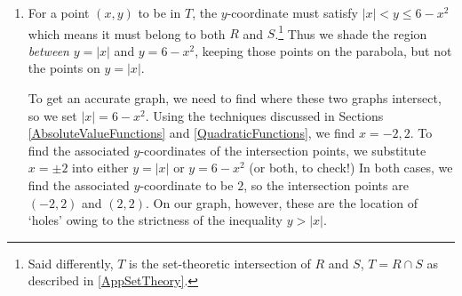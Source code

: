\documentclass{ximera}
\begin{document}
\begin{example}
\begin{explanation}
\begin{enumerate}
\begin{enumerate}
\begin{image}
\end{image}

\item For a point $(x,y)$ to be in $T$, the $y$-coordinate must satisfy $|x| < y \leq 6-x^2$ which means it must belong to both $R$ and $S$.\footnote{Said differently, $T$ is the set-theoretic intersection of $R$ and $S$, $T = R \cap S$ as described in \ref{AppSetTheory}.} Thus we shade the region \textit{between} $y=|x|$ and $y=6-x^2$, keeping those points on the parabola, but not the points on $y=|x|$.  

To get an accurate graph, we need to find where these two graphs intersect, so we set $|x| = 6-x^2$.  Using the techniques discussed in Sections \ref{AbsoluteValueFunctions} and \ref{QuadraticFunctions}, we find  $x=-2,2$.  To find the associated $y$-coordinates of the intersection points, we substitute $x= \pm 2$ into either $y = |x|$ or $y = 6-x^2$ (or both, to check!)  In both cases, we find the associated $y$-coordinate  to be $2$, so the intersection points are $(-2,2)$ and $(2,2)$.  On our graph, however, these are the location of `holes' owing to the strictness of the inequality $y > |x|$.

\begin{image}
\end{image}
\end{enumerate}
\end{enumerate}
\end{explanation}
\end{example}
\end{document}
